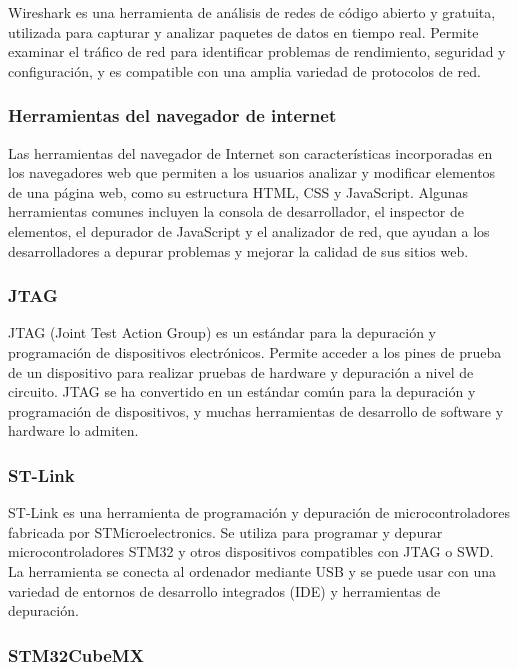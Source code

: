 Wireshark \citep{wireshark} es una herramienta de análisis de redes de código abierto y gratuita, utilizada para capturar y analizar paquetes de datos en tiempo real. Permite examinar el tráfico de red para identificar problemas de rendimiento, seguridad y configuración, y es compatible con una amplia variedad de protocolos de red.


\subsubsection{Herramientas del navegador de internet}

Las herramientas del navegador de Internet son características incorporadas en los navegadores web que permiten a los usuarios analizar y modificar elementos de una página web, como su estructura HTML, CSS y JavaScript. Algunas herramientas comunes incluyen la consola de desarrollador, el inspector de elementos, el depurador de JavaScript y el analizador de red, que ayudan a los desarrolladores a depurar problemas y mejorar la calidad de sus sitios web.


\subsubsection{JTAG}

JTAG (Joint Test Action Group) \citep{jtag} es un estándar para la depuración y programación de dispositivos electrónicos. Permite acceder a los pines de prueba de un dispositivo para realizar pruebas de hardware y depuración a nivel de circuito. JTAG se ha convertido en un estándar común para la depuración y programación de dispositivos, y muchas herramientas de desarrollo de software y hardware lo admiten.


\subsubsection{ST-Link}

ST-Link \citep{st-link} es una herramienta de programación y depuración de microcontroladores fabricada por STMicroelectronics. Se utiliza para programar y depurar microcontroladores STM32 y otros dispositivos compatibles con JTAG o SWD. La herramienta se conecta al ordenador mediante USB y se puede usar con una variedad de entornos de desarrollo integrados (IDE) y herramientas de depuración. 


\subsubsection{STM32CubeMX}


